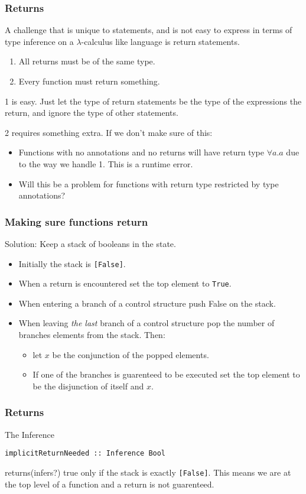 \documentclass{beamer}
\begin{document}
\begin{frame}
\frametitle{Returns}
A challenge that is unique to statements, and is not easy to express in terms of type inference on a $\lambda$-calculus like language is return statements.
\begin{enumerate}
\item All returns must be of the same type.
\item Every function must return something.
\end{enumerate}
1 is easy. Just let the type of return statements be the type of the expressions the return, and ignore the type of other statements.

2 requires something extra. If we don't make sure of this:
\begin{itemize}
\item Functions with no annotations and no returns will have return type $\forall a. a$ due to the way we handle 1. This is a runtime error.
\item Will this be a problem for functions with return type restricted by type annotations?
\end{itemize}
\end{frame}

\begin{frame}[fragile]
\frametitle{Making sure functions return}
Solution: Keep a stack of booleans in the state.
\begin{itemize}
\item Initially the stack is \lstinline{[False]}.
\item When a return is encountered set the top element to \lstinline{True}.
\item When entering a branch of a control structure push False on the stack.
\item When leaving \emph{the last} branch of a control structure pop the number of branches elements from the stack. Then:
\begin{itemize}
  \item let $x$ be the conjunction of the popped elements.
  \item If one of the branches is guarenteed to be executed set the top element to be the disjunction of itself and $x$.
\end{itemize}
\end{itemize}
\end{frame}

\begin{frame}[fragile]
\frametitle{Returns}
The Inference
\begin{lstlisting}
implicitReturnNeeded :: Inference Bool
\end{lstlisting}
returns(infers?) true only if the stack is exactly \lstinline{[False]}. This means we are at the top level of a function and a return is not guarenteed.
\end{frame}
\end{document}
